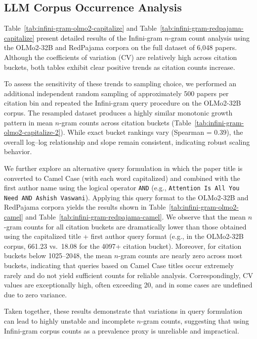 \documentclass[11pt]{article}
\begin{document}
\subsection{LLM Corpus Occurrence Analysis}
\label{sec:appendix_corpus_occurrence}

Table~\ref{tab:infini-gram-olmo2-capitalize} and Table~\ref{tab:infini-gram-redpajama-capitalize} present detailed results of the Infini-gram $n$-gram count analysis using the OLMo2-32B and RedPajama corpora on the full dataset of 6,048 papers. Although the coefficients of variation (CV) are relatively high across citation buckets, both tables exhibit clear positive trends as citation counts increase.

To assess the sensitivity of these trends to sampling choice, we performed an additional independent random sampling of approximately 500 papers per citation bin and repeated the Infini-gram query procedure on the OLMo2-32B corpus. The resampled dataset produces a highly similar monotonic growth pattern in mean $n$-gram counts across citation buckets (Table~\ref{tab:infini-gram-olmo2-capitalize-2}). While exact bucket rankings vary (Spearman = 0.39), the overall log–log relationship and slope remain consistent, indicating robust scaling behavior.

We further explore an alternative query formulation in which the paper title is converted to Camel Case (with each word capitalized) and combined with the first author name using the logical operator \texttt{AND} (e.g., \texttt{Attention Is All You Need AND Ashish Vaswani}). Applying this query format to the OLMo2-32B and RedPajama corpora yields the results shown in Table~\ref{tab:infini-gram-olmo2-camel} and Table~\ref{tab:infini-gram-redpajama-camel}. We observe that the mean $n$-gram counts for all citation buckets are dramatically lower than those obtained using the capitalized title + first author query format (e.g., in the OLMo2-32B corpus, 661.23 vs.\ 18.08 for the 4097+ citation bucket). Moreover, for citation buckets below 1025--2048, the mean $n$-gram counts are nearly zero across most buckets, indicating that queries based on Camel Case titles occur extremely rarely and do not yield sufficient counts for reliable analysis. Correspondingly, CV values are exceptionally high, often exceeding 20, and in some cases are undefined due to zero variance.

Taken together, these results demonstrate that variations in query formulation can lead to highly unstable and incomplete $n$-gram counts, suggesting that using Infini-gram corpus counts as a prevalence proxy is unreliable and impractical.
\end{document}
